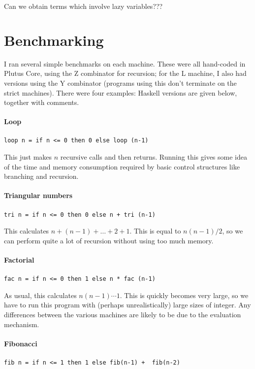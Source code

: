 \documentclass[a4paper]{article}
\begin{document}
Can we obtain terms which involve lazy variables???


\section{Benchmarking}\label{sec:benchmarks}
I ran several simple benchmarks on each machine. These were all hand-coded
in Plutus Core, using the Z combinator for recursion; for the L machine, I also
had versions using the Y combinator (programs using this don't terminate on the 
strict machines).  There were four examples: Haskell versions are given below, 
together with comments.

\paragraph{Loop}
\begin{verbatim}
loop n = if n <= 0 then 0 else loop (n-1)
\end{verbatim}

\noindent This just makes $n$ recursive calls and then returns.
Running this gives some idea of the time and memory consumption
required by basic control structures like branching and recursion.

\paragraph{Triangular numbers}
\begin{verbatim}
tri n = if n <= 0 then 0 else n + tri (n-1)
\end{verbatim}

\noindent This calculates $n + (n-1) + \ldots + 2 + 1$.  This is equal to
$n(n-1)/2$, so we can perform quite a lot of recursion without using too much memory.

\paragraph{Factorial}
\begin{verbatim}
fac n = if n <= 0 then 1 else n * fac (n-1)
\end{verbatim}

\noindent As usual, this calculates $n(n-1)\cdots1$.  This is quickly
becomes very large, so we have to run this program with (perhaps
unrealistically) large sizes of integer.  Any differences between the
various machines are likely to be due to the evaluation mechanism.

\paragraph{Fibonacci}
\begin{verbatim}
fib n = if n <= 1 then 1 else fib(n-1) +  fib(n-2)
\end{verbatim}
\end{document}
